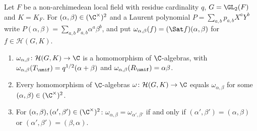 Let $F$ be a non-archimedean local field with residue cardinality $q$, $G=\GL_2(F)$ and $K=K_F$. For
$(\alpha,\beta)\in(\C^\times)^2$ and a Laurent polynomial $P=\sum_{a,b}p_{a,b}X^aY^b$ write
$P(\alpha,\beta)=\sum_{a,b}p_{a,b}\alpha^a\beta^b$, and put $\omega_{\alpha,\beta}(f)=(\Sat f)(\alpha,\beta)$ for
$f\in\mathcal H(G,K)$.
\begin{enumerate}[label=(\alph*)]
\item $\omega_{\alpha,\beta}\colon\mathcal H(G,K)\to\C$ is a homomorphism of $\C$-algebras, with
  $\omega_{\alpha,\beta}(T_\unif)=q^{1/2}(\alpha+\beta)$ and $\omega_{\alpha,\beta}(R_\unif)=\alpha\beta$.
\item Every homomorphism of $\C$-algebras $\omega\colon\mathcal H(G,K)\to\C$ equals $\omega_{\alpha,\beta}$ for some
  $(\alpha,\beta)\in(\C^\times)^2$.
\item For $(\alpha,\beta),(\alpha',\beta')\in(\C^\times)^2$: $\omega_{\alpha,\beta}=\omega_{\alpha',\beta'}$ if and only if
  $(\alpha',\beta')=(\alpha,\beta)$ or $(\alpha',\beta')=(\beta,\alpha)$.
\end{enumerate}

